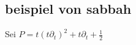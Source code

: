 % 

\subsection{beispiel von sabbah}

Sei $P=t(t\partial_t)^2+t\partial_t+\frac{1}{2}$

\begin{comment}
  \begin{enumerate}
      \item zeige $\cD/\cD\cdotP$ ist ein Meromorpher Zusammenhang.
      \item Zeichne das Newton Polygon von $P$ und finde eine formale
        Aufteilung von $\cM_{\hat{K}}$.
      \item Zeige $\cM$ kann nicht in eine direkte Summe von zwei $\cD$ modulen
        zerlegt werden, dazu:
        \begin{enumerate}
          \item Zeige das die Produktzerlegung
            \[ P=(t(t\partial_t)+v(t))\cdot(t\partial_t+u(t)) \,, \]
            mit $u,v\in\Cfu$, existiert.
          \item Berechne durch induktion die koeffizienten von $u$.
          \item Zeige dass $u \notin \C((u))$.
        \end{enumerate}
  \end{enumerate}
\end{comment}


